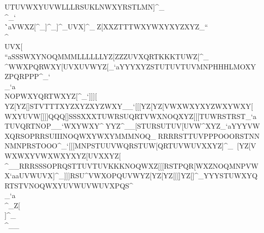 UTUVWXYUVWLLLRSUKLNWXYRSTLMN]^_                                                            \\\QRSOOOTUVRRRRSTMOPSTVOPQLLLFFF^_`                                                            \\\``aVWXZ[\XYZXYZ[\]]^_]^_]^_UVX]^_                                                            ^^^Z[\YZ[YZ[\]]XXZTTTWXYWXYXYZXYZ_``                                                            \\\YZ[VWXVWXWXYWXYXYZXYZYZ[YZ[Z[\\]^                                                            \\\[\]UVX[\\``aSSSWXYNOQMMMLLLLLLYZ[                                                            ZZZUVXQRTKKKTUWZ[\QRT[\]UVXYZ[UVW]^_                                                            \\\STVSTV\]^WWXPQRWXY[\]UVXUVWYZ[_`a                                                            YYYXYZSTUTUVTUVMNPHHHLMOXYZPQRPPP^_`                                                            \\\NNNOPQQRSSSSOPRPQRQRTLLLNOPLLL_`a                                                            \\\[\]NOPWXYQRTWXYZ[\WXYUVWVWXUVW^_`                                                            ]]][\\YZ[YZ[\]]STVTTTXYZXYZXYZWXY__`                                                            [[[YZ[YZ[VWXWXYXYZWXYWXY[\]WXYUVW[\]                                                            ]]]QQQ[\]\]]SSSXXXTUWRSUQRTVWXNOQXYZ                                                            [[[TUWRSTRST_`aTUVQRTNOP__`WXYWXY\]^                                                            ^^^YYZ^__[\]STURSUTUV[\]UVW\]^XYZ_`a                                                            YYYVWXQRSOPRRSUIIINOQWXYWXYMMMNOQ\]_                                                            ^^^RRRRSTTUVPPPOOORSTNNNMNPRSTOOO^_`                                                            [[[MNPSTUUVWQRSTUW[\]QRTUVWUVXXYZ]^_                                                            ^^^^^_[\][\]WXYSTVTTTWXYXYZXYZWXY^^_                                                            [[[\\]YZ[VWXWXYVWXWXYXYZ[\]UVXXYZ[\]                                                            \\\RRR^__RRRSSSOPRQSTTUVTUVKKKNOQWXZ                                                            [[[RSTPQR[\]WXZNOQMNPVWX`aaUVWUVX]^_                                                            ]]]RSU\]^VWXOPQUVWYZ[YZ[YZ[[[]YZ[]^_                                                            YYYSTUWXYQRTSTVNOQWXYUVWUVWUVXPQS\]^                                                            \\\OPROPRJLMSTURSTNOQPQROPQRSTUVW_`a                                                            \\\STU[\]YZ[WXZ^^_[\]RST]^_Z[\[\]]^_                                                            \\\XYZWXYWXYXYZUVXTTTXYZWXYVWXWXY^__                                                 